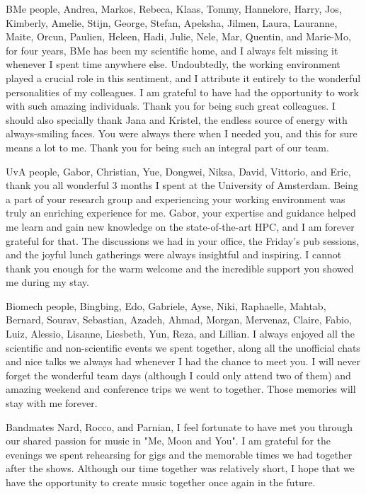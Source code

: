 BMe people, Andrea, Markos, Rebeca, Klaas, Tommy, Hannelore, Harry, Jos, Kimberly, Amelie, Stijn, George, Stefan, Apeksha,  Jilmen, Laura, Lauranne, Maite, Orcun, Paulien, Heleen, Hadi, Julie, Nele, Mar, Quentin, and Marie-Mo, for four years, BMe has been my scientific home, and I always felt missing it whenever I spent time anywhere else. Undoubtedly, the working environment played a crucial role in this sentiment, and I attribute it entirely to the wonderful personalities of my colleagues. I am grateful to have had the opportunity to work with such amazing individuals. Thank you for being such great colleagues. I should also specially thank Jana and Kristel, the endless source of energy with always-smiling faces. You were always there when I needed you, and this for sure means a lot to me. Thank you for being such an integral part of our team.

UvA people, Gabor, Christian, Yue, Dongwei, Niksa, David, Vittorio, and Eric, thank you all wonderful 3 months I spent at the University of Amsterdam. Being a part of your research group and experiencing your working environment was truly an enriching experience for me. Gabor, your expertise and guidance helped me learn and gain new knowledge on the state-of-the-art HPC, and I am forever grateful for that. The discussions we had in your office, the Friday's pub sessions, and the joyful lunch gatherings were always insightful and inspiring. I cannot thank you enough for the warm welcome and the incredible support you showed me during my stay.

Biomech people, Bingbing, Edo, Gabriele, Ayse, Niki, Raphaelle, Mahtab, Bernard, Sourav, Sebastian, Azadeh, Ahmad, Morgan, Mervenaz, Claire, Fabio, Luiz, Alessio, Lisanne, Liesbeth, Yun, Reza, and Lillian. I always enjoyed all the scientific and non-scientific events we spent together, along all the unofficial chats and nice talks we always had whenever I had the chance to meet you. I will never forget the wonderful team days (although I could only attend two of them) and amazing weekend and conference trips we went to together. Those memories will stay with me forever.

Bandmates Nard, Rocco, and Parnian, I feel fortunate to have met you through our shared passion for music in "Me, Moon and You". I am grateful for the evenings we spent rehearsing for gigs and the memorable times we had together after the shows. Although our time together was relatively short, I hope that we have the opportunity to create music together once again in the future.

